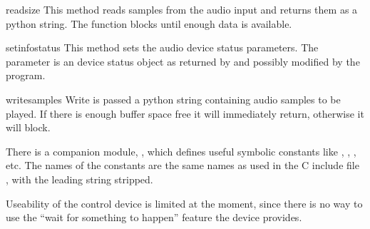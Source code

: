 \begin{funcdesc}{read}{size}
This method reads  samples from the audio input and returns
them as a python string. The function blocks until enough data is available.
\end{funcdesc}

\begin{funcdesc}{setinfo}{status}
This method sets the audio device status parameters. The 
parameter is an device status object as returned by  and
possibly modified by the program.
\end{funcdesc}

\begin{funcdesc}{write}{samples}
Write is passed a python string containing audio samples to be played.
If there is enough buffer space free it will immediately return,
otherwise it will block.
\end{funcdesc}

There is a companion module, , which defines useful
symbolic constants like , ,
, etc. The names of
the constants are the same names as used in the C include file
, with the leading string  stripped.

Useability of the control device is limited at the moment, since there
is no way to use the ``wait for something to happen'' feature the
device provides.
